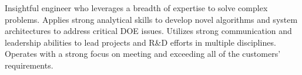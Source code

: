 

\begin{cvparagraph}

Insightful engineer who leverages a breadth of expertise to solve complex problems. Applies strong analytical skills to develop novel algorithms and system architectures to address critical DOE issues. Utilizes strong communication and leadership abilities to lead projects and R\&D efforts in multiple disciplines. Operates with a strong focus on meeting and exceeding all of the customers’ requirements.
\end{cvparagraph}
